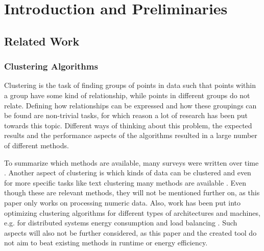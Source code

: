 \documentclass[
	a4paper,
	english,
	twoside,
	openright,               
	11pt                            
	]{report}
\begin{document}




\tableofcontents
 \cleardoublepage
%
%
\listoffigures
\cleardoublepage

\cleardoublepage

\cleardoublepage

 \part{Introduction and Preliminaries}
   \setcounter{page}{1}
 


\chapter{Related Work}\label{cha:related_work}
\section{Clustering Algorithms}

Clustering is the task of finding groups of points in data such that points within a group have some kind of relationship, while points in different groups do not relate. Defining how relationships can be expressed and how these groupings can be found are non-trivial tasks, for which reason a lot of research has been put towards this topic. Different ways of thinking about this problem, the expected results and the performance aspects of the algorithms resulted in a large number of different methods. 

 To summarize which methods are available, many surveys were written over time \cite{7154919,1427769,7414675,surveyclustering}. Another aspect of clustering is which kinds of data can be clustered and even for more specific tasks like text clustering many methods are available \cite{5982288}. Even though these are relevant methods, they will not be mentioned further on, as this paper only works on processing numeric data. Also, work has been put into optimizing clustering algorithms for different types of architectures and machines, e.g. for distributed systems \cite{6322592} energy consumption and load balancing \cite{7586361}. Such aspects will also not be further considered, as this paper and the created tool do not aim to beat existing methods in runtime or energy efficiency.
\end{document}
